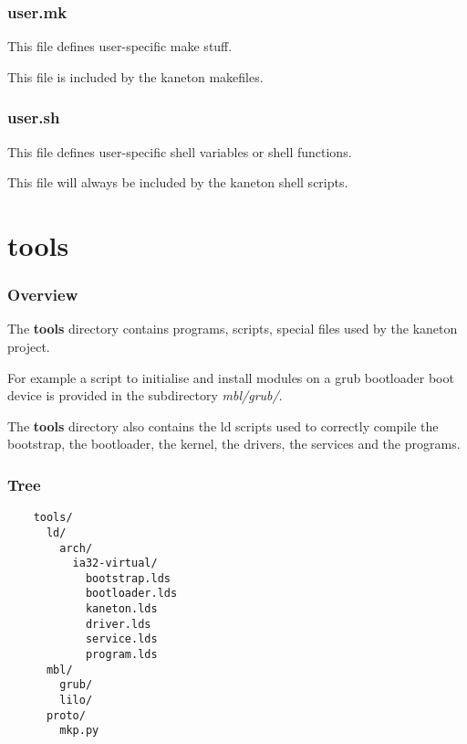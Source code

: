
\begin{frame}
  \frametitle{user.mk}

  This file defines user-specific make stuff.

  \nl

  This file is included by the kaneton makefiles.
\end{frame}


\begin{frame}
  \frametitle{user.sh}

  This file defines user-specific shell variables or shell functions.

  \nl

  This file will always be included by the kaneton shell scripts.
\end{frame}

%
%

\section{tools}


\begin{frame}
  \frametitle{Overview}

  The \textbf{tools} directory contains programs, scripts, special
  files used by the kaneton project.

  \nl

  For example a script to initialise and install modules on a grub
  bootloader boot device is provided in the subdirectory
  \textit{mbl/grub/}.

  \nl

  The \textbf{tools} directory also contains the ld scripts used
  to correctly compile the bootstrap, the bootloader, the kernel, the
  drivers, the services and the programs.
\end{frame}


\begin{frame}[containsverbatim]
  \frametitle{Tree}

  \begin{verbatim}
    tools/
      ld/
        arch/
          ia32-virtual/
            bootstrap.lds
            bootloader.lds
            kaneton.lds
            driver.lds
            service.lds
            program.lds
      mbl/
        grub/
        lilo/
      proto/
        mkp.py
  \end{verbatim}
\end{frame}

